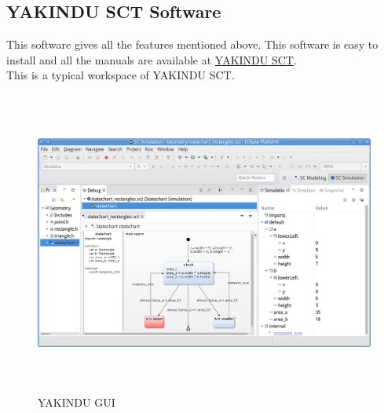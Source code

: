\documentclass[a4paper,12pt,oneside]{article}
\begin{document}
\subsection{YAKINDU SCT Software}
This software gives all the features mentioned above. This software is easy to install and all the manuals are available at \href{https://www.itemis.com/en/yakindu/statechart-tools/}{YAKINDU SCT}.\\
This is a typical workspace of YAKINDU SCT.
\newpage
\begin{figure}[H]
\centering
\includegraphics[width=14cm,height=10cm]{gui.png}
\caption{YAKINDU GUI}
\end{figure}
\newpage
\end{document}
